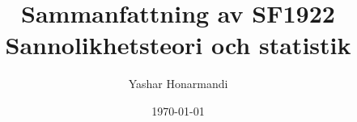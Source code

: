 \documentclass[a4paper, 11pt]{article}
\title{Sammanfattning av SF1922 Sannolikhetsteori och statistik}
\author{Yashar Honarmandi}
\date{\today}
\begin{document}
\maketitle

\begin{abstract}
	
\end{abstract}

\thispagestyle{empty}

\newpage

\tableofcontents

\newpage













\end{document}
